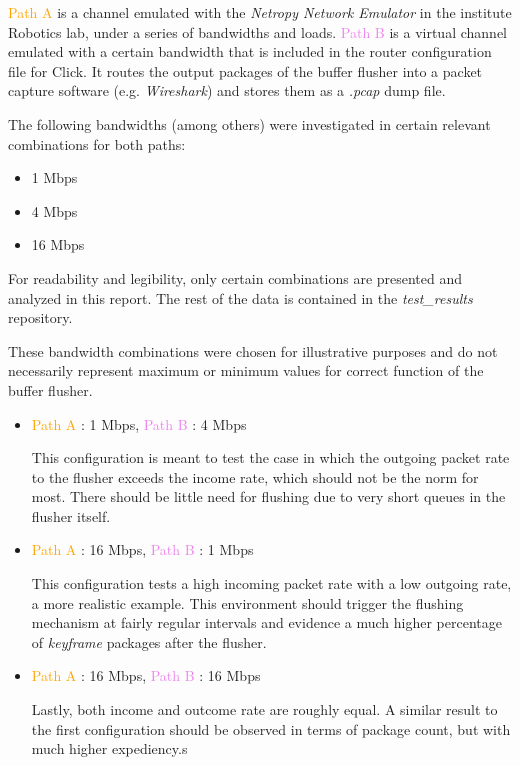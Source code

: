 \textcolor{orange}{Path A} is a channel emulated with the \textit{Netropy Network Emulator} in the institute Robotics lab, under a series of bandwidths and loads. \textcolor{violet}{Path B} is a virtual channel emulated with a certain bandwidth that is included in the router configuration file for Click. It routes the output packages of the buffer flusher into a packet capture software (e.g. \textit{Wireshark}) and stores them as a \textit{.pcap} dump file.

The following bandwidths (among others) were investigated in certain relevant combinations for both paths:

\begin{itemize}
\item{1 Mbps}
\item{4 Mbps}
\item{16 Mbps}
\end{itemize}


For readability and legibility, only certain combinations are presented and analyzed in this report. The rest of the data is contained in the \textit{test\_results} repository.

These bandwidth combinations were chosen for illustrative purposes and do not necessarily represent maximum or minimum values for correct function of the buffer flusher. 

\begin{itemize}
\item{\textcolor{orange}{Path A} : 1 Mbps, \textcolor{violet}{Path B} : 4 Mbps

This configuration is meant to test the case in which the outgoing packet rate to the flusher exceeds the income rate, which should not be the norm for most. There should be little need for flushing due to very short queues in the flusher itself.}

\item{
\textcolor{orange}{Path A} : 16 Mbps, \textcolor{violet}{Path B} : 1 Mbps

This configuration tests a high incoming packet rate with a low outgoing rate, a more realistic example. This environment should trigger the flushing mechanism at fairly regular intervals and evidence a much higher percentage of \textit{keyframe} packages after the flusher.
}

\item{
\textcolor{orange}{Path A} : 16 Mbps, \textcolor{violet}{Path B} : 16 Mbps

Lastly, both income and outcome rate are roughly equal. A similar result to the first configuration should be observed in terms of package count, but with much higher expediency.s
}

\end{itemize}

